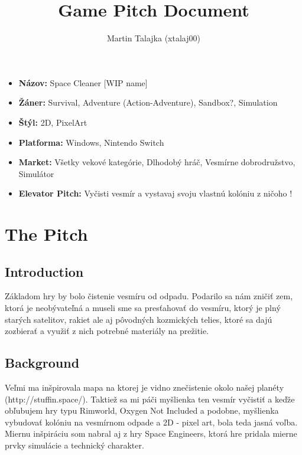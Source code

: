 \documentclass[a4paper,10pt,slovak]{article}
\title{%
Game Pitch Document%
}
\author{%
Martin Talajka (xtalaj00)%
}
\date{}
\begin{document}
\maketitle
\thispagestyle{empty}

{%
\large

\begin{itemize}

\item[] \textbf{Názov:} Space Cleaner [WIP name]

\item[] \textbf{Žáner:} Survival, Adventure (Action-Adventure), Sandbox?, Simulation

\item[] \textbf{Štýl:} 2D, PixelArt

\item[] \textbf{Platforma:} Windows, Nintendo Switch

\item[] \textbf{Market:} Všetky vekové kategórie, Dlhodobý hráč, Vesmírne dobrodružstvo, Simulátor

\item[] \textbf{Elevator Pitch:} Vyčisti vesmír a vystavaj svoju vlastnú kolóniu z ničoho !

\end{itemize}

}

\section*{\centering The Pitch}

\subsection*{Introduction}
Základom hry by bolo čistenie vesmíru od odpadu. Podarilo sa nám zničiť zem, ktorá je neobývateľná a museli sme sa presťahovať do vesmíru, ktorý je plný starých satelitov, rakiet ale aj pôvodných kozmických telies, ktoré sa dajú zozbierať a využiť z nich potrebné materiály na prežitie. 

\subsection*{Background}
Veľmi ma inšpirovala mapa na ktorej je vidno znečistenie okolo našej planéty (http://stuffin.space/). Taktiež sa mi páči myšlienka ten vesmír vyčistiť a keďže obľubujem hry typu Rimworld, Oxygen Not Included a podobne, myšlienka vybudovať kolóniu na vesmírnom odpade a 2D - pixel art, bola teda jasná voľba. Miernu inšpiráciu som nabral aj z hry Space Engineers, ktorá hre pridala mierne prvky simulácie a technický charakter.
\end{document}
